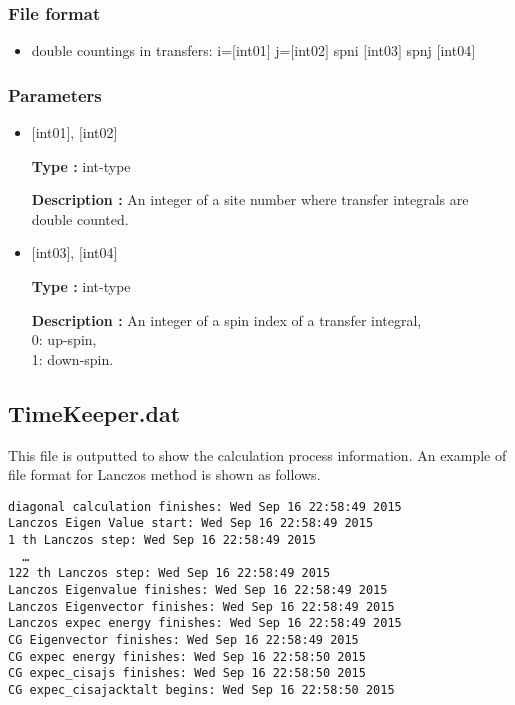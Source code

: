 \subsubsection{File format}
 \begin{itemize}
   \item  double countings in transfers: i=$[$int01$]$ j=$[$int02$]$ spni $[$int03$]$  spnj $[$int04$]$   
 \end{itemize}
 
\subsubsection{Parameters}
 \begin{itemize}

    \item  $[$int01$]$, $[$int02$]$
   
    {\bf Type :} int-type

   {\bf Description :} An integer of a site number where transfer integrals are double counted.
      
         \item  $[$int03$]$, $[$int04$]$  
   
    {\bf Type :} int-type

   {\bf Description :} An integer of a spin index of a transfer integral, \\
   0: up-spin,\\
   1: down-spin.\\ 
\end{itemize}

\newpage
\subsection{TimeKeeper.dat}
This file is outputted to show the calculation process information.
An example of file format for Lanczos method is shown as follows.

\begin{minipage}{12.5cm}
\begin{screen}
\begin{verbatim}
diagonal calculation finishes: Wed Sep 16 22:58:49 2015
Lanczos Eigen Value start: Wed Sep 16 22:58:49 2015
1 th Lanczos step: Wed Sep 16 22:58:49 2015
  …
122 th Lanczos step: Wed Sep 16 22:58:49 2015
Lanczos Eigenvalue finishes: Wed Sep 16 22:58:49 2015
Lanczos Eigenvector finishes: Wed Sep 16 22:58:49 2015
Lanczos expec energy finishes: Wed Sep 16 22:58:49 2015
CG Eigenvector finishes: Wed Sep 16 22:58:49 2015
CG expec energy finishes: Wed Sep 16 22:58:50 2015
CG expec_cisajs finishes: Wed Sep 16 22:58:50 2015
CG expec_cisajacktalt begins: Wed Sep 16 22:58:50 2015
\end{verbatim}
\end{screen}
\end{minipage}

